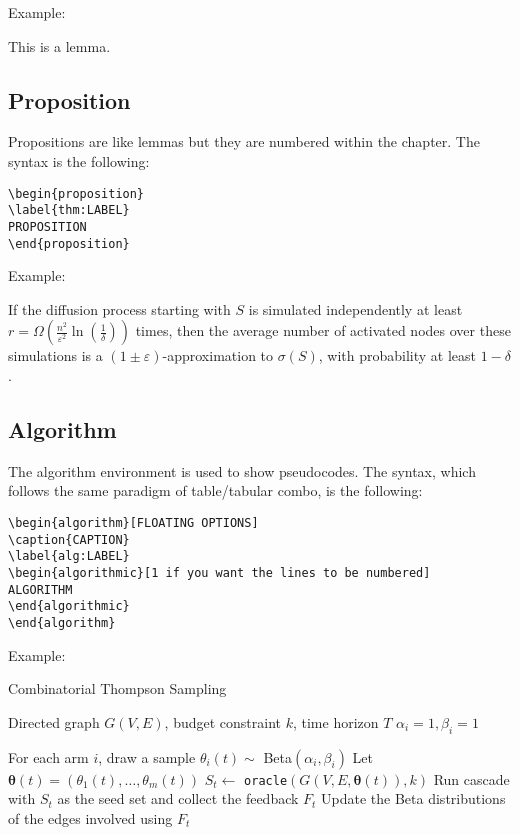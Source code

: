 \noindent Example:

\begin{lemma}
\label{thm:lemma}
This is a lemma.
\end{lemma}

\subsection*{Proposition}
Propositions are like lemmas but they are numbered within the chapter. The syntax is the following:
\begin{verbatim}
\begin{proposition}
\label{thm:LABEL}
PROPOSITION
\end{proposition}
\end{verbatim}

\noindent Example:

\begin{proposition}
\label{thm:chernoff}
If the diffusion process starting with $S$ is simulated independently at least $r=\Omega\left(\frac{n^2}{\varepsilon^2}\ln\left(\frac{1}{\delta}\right)\right)$ times, then the average number of activated nodes over these simulations is a $(1 \pm \varepsilon)$-approximation to $\sigma(S)$, with probability at least $1 - \delta$.
\end{proposition}

\subsection*{Algorithm}
The algorithm environment is used to show pseudocodes. The syntax, which follows the same paradigm of table/tabular combo, is the following:
\begin{verbatim}
\begin{algorithm}[FLOATING OPTIONS]
\caption{CAPTION}
\label{alg:LABEL}
\begin{algorithmic}[1 if you want the lines to be numbered]
ALGORITHM
\end{algorithmic}
\end{algorithm}
\end{verbatim}

\noindent Example:

\begin{algorithm}[H]
\caption{Combinatorial Thompson Sampling}
\label{alg:cts}
\begin{algorithmic}[1]
\Require Directed graph $G(V,E)$, budget constraint $k$, time horizon $T$
\State $\alpha_i = 1, \beta_i = 1$ 
\EndFor

\State For each arm $i$, draw a sample $\theta_i(t) \sim$ Beta$(\alpha_i, \beta_i)$
\State Let $\boldsymbol{\theta}(t) = \left(\theta_1(t), \ldots, \theta_m(t) \right)$
\State $S_t \gets$ \texttt{oracle}$(G(V,E,\boldsymbol{\theta}(t)), k)$
\State Run cascade with $S_t$ as the seed set and collect the feedback $F_t$
\State Update the Beta distributions of the edges involved using $F_t$
\EndFor
\end{algorithmic}
\end{algorithm}

